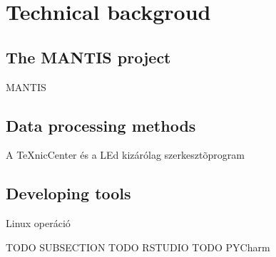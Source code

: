 \chapter{Technical backgroud}
\section{The MANTIS project}
MANTIS

\section{Data processing methods}
A TeXnicCenter és a LEd kizárólag szerkesztõprogram 

\section{Developing tools}
Linux operáció

TODO SUBSECTION
TODO RSTUDIO
TODO PYCharm